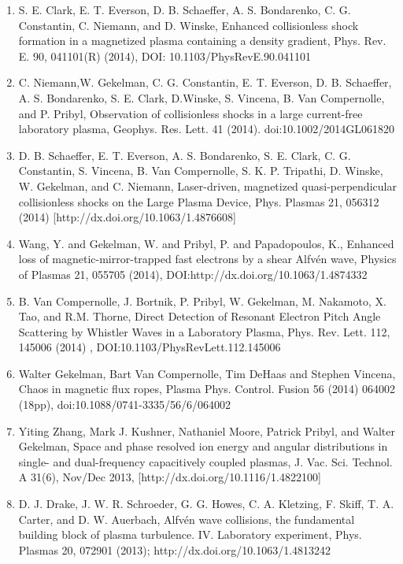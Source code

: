 \documentclass[11pt]{article}
\begin{document}
\begin{enumerate}
\item   S. E. Clark, E. T. Everson, D. B. Schaeffer, A. S. Bondarenko, C. G. Constantin, C. Niemann, and D. Winske, Enhanced collisionless shock formation in a magnetized plasma containing a density gradient, Phys. Rev. E. 90, 041101(R) (2014), DOI: 10.1103/PhysRevE.90.041101

\item    C. Niemann,W. Gekelman, C. G. Constantin, E. T. Everson, D. B. Schaeffer, A. S. Bondarenko, S. E. Clark, D.Winske, S. Vincena, B. Van Compernolle, and P. Pribyl, Observation of collisionless shocks in a large current-free laboratory plasma, Geophys. Res. Lett.  41 (2014). doi:10.1002/2014GL061820

\item   D. B. Schaeffer, E. T. Everson, A. S. Bondarenko, S. E. Clark, C. G. Constantin, S. Vincena, B. Van Compernolle, S. K. P. Tripathi, D. Winske, W. Gekelman, and C. Niemann, Laser-driven, magnetized quasi-perpendicular collisionless shocks on the Large Plasma Device, Phys. Plasmas 21, 056312 (2014) [http://dx.doi.org/10.1063/1.4876608]

\item  Wang, Y. and Gekelman, W. and Pribyl, P. and Papadopoulos, K., Enhanced loss of magnetic-mirror-trapped fast electrons by a shear Alfv\'{e}n wave, Physics of Plasmas  21, 055705 (2014), DOI:http://dx.doi.org/10.1063/1.4874332

\item   B. Van Compernolle, J. Bortnik, P. Pribyl, W. Gekelman, M. Nakamoto, X. Tao, and R.M. Thorne, Direct Detection of Resonant Electron Pitch Angle Scattering by Whistler Waves in a Laboratory Plasma, Phys. Rev. Lett. 112, 145006 (2014) , DOI:10.1103/PhysRevLett.112.145006

\item  Walter Gekelman, Bart Van Compernolle, Tim DeHaas and Stephen Vincena, Chaos in magnetic flux ropes, Plasma Phys. Control. Fusion 56 (2014) 064002 (18pp), doi:10.1088/0741-3335/56/6/064002

\item   Yiting Zhang, Mark J. Kushner, Nathaniel Moore, Patrick Pribyl, and Walter Gekelman, Space and phase resolved ion energy and angular distributions in single- and dual-frequency capacitively coupled plasmas, J. Vac. Sci. Technol. A 31(6), Nov/Dec 2013, [http://dx.doi.org/10.1116/1.4822100]

\item  D. J. Drake, J. W. R. Schroeder, G. G. Howes, C. A. Kletzing, F. Skiff, T. A. Carter, and D. W. Auerbach, Alfv\'{e}n wave collisions, the fundamental building block of plasma turbulence. IV. Laboratory experiment, Phys. Plasmas 20, 072901 (2013); http://dx.doi.org/10.1063/1.4813242


\end{enumerate}
\end{document}
